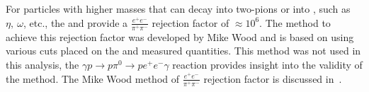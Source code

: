 For particles with higher masses that can decay into two-pions  or into \epem, such as $\eta,\ \omega$, etc., the  and  provide a $\frac{e^+e^-}{\pi^+\pi^-}$ rejection factor of $\approx 10^6$. The method to achieve this rejection factor was developed by Mike Wood and is based on using various cuts placed on the  and  measured quantities. This method was not used in this analysis, the $\gamma p \to  p \pi^0 \to p e^+e^-\gamma$ reaction provides insight into the validity of the method. The Mike Wood method of $\frac{e^+e^-}{\pi^+\pi^-}$ rejection factor is discussed in~\cite{clas.g12.note}.   

